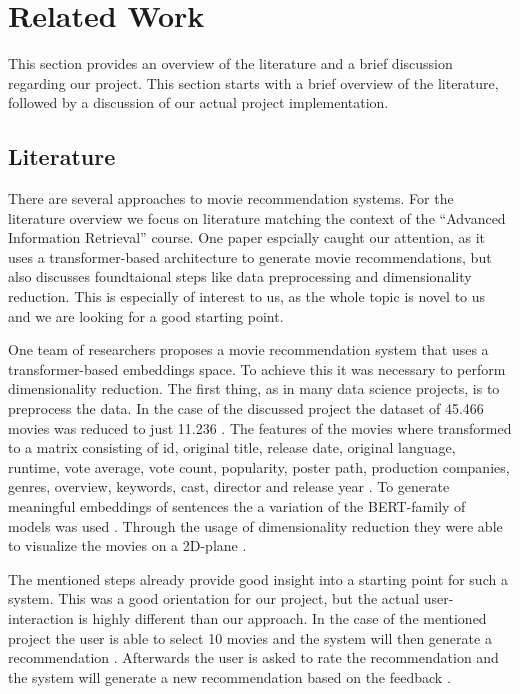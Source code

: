 \documentclass[12pt,a4paper]{article}
\begin{document}
\section{Related Work}

This section provides an overview of the literature and a brief discussion regarding our project.
This section starts with a brief overview of the literature, followed by a discussion of our actual project implementation.

\subsection{Literature}

There are several approaches to movie recommendation systems.
For the literature overview we focus on literature matching the context of the ``Advanced Information Retrieval'' course.
One paper espcially caught our attention, as it uses a transformer-based architecture to generate movie recommendations,
but also discusses foundtaional steps like data preprocessing and dimensionality reduction.
This is especially of interest to us, as the whole topic is novel to us and we are looking for a good starting point.

\noindent One team of researchers \cite{Iglesias-pardo-lopez-quintero-2024} proposes a movie recommendation system that uses a
transformer-based embeddings space. To achieve this it was necessary to perform dimensionality reduction.
The first thing, as in many data science projects, is to preprocess the data.
In the case of the discussed project the dataset of 45.466 movies was reduced to just 11.236 \cite{Iglesias-pardo-lopez-quintero-2024}.
The features of the movies where transformed to a matrix consisting of id, original title, release date,
original language, runtime, vote average, vote count, popularity, poster path, production companies, genres, overview,
keywords, cast, director and release year \cite{Iglesias-pardo-lopez-quintero-2024}.
To generate meaningful embeddings of sentences the a variation of the BERT-family of models was used \cite{Iglesias-pardo-lopez-quintero-2024}.
Through the usage of dimensionality reduction they were able to visualize the movies on a 2D-plane \cite{Iglesias-pardo-lopez-quintero-2024}.

\noindent The mentioned steps already provide good insight into a starting point for such a system.
This was a good orientation for our project, but the actual user-interaction is highly different than our approach.
In the case of the mentioned project the user is able to select 10 movies and the system will then generate a recommendation \cite{Iglesias-pardo-lopez-quintero-2024}.
Afterwards the user is asked to rate the recommendation and the system will generate a new recommendation based on the feedback \cite{Iglesias-pardo-lopez-quintero-2024}.
\end{document}
